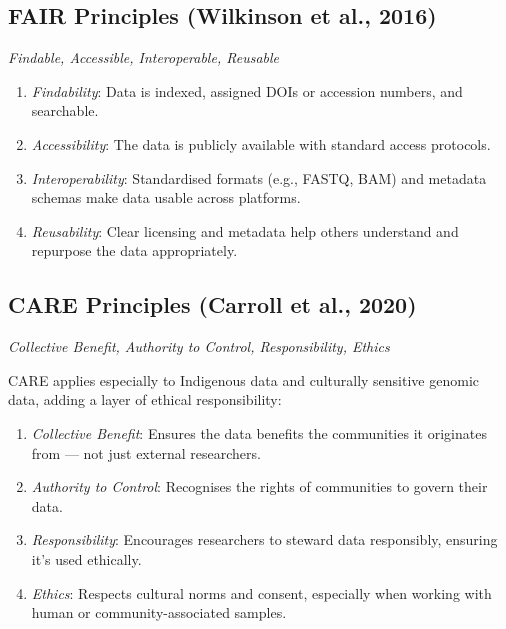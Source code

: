 \documentclass[
]{article}
\begin{document}
\hypertarget{fair-principles-wilkinson-et-al.-2016}{%
\subsection{FAIR Principles (Wilkinson et al.,
2016)}\label{fair-principles-wilkinson-et-al.-2016}}

\emph{Findable, Accessible, Interoperable, Reusable}

\begin{enumerate}
\def\labelenumi{\arabic{enumi}.}
\item
  \emph{Findability}: Data is indexed, assigned DOIs or accession
  numbers, and searchable.
\item
  \emph{Accessibility}: The data is publicly available with standard
  access protocols.
\item
  \emph{Interoperability}: Standardised formats (e.g., FASTQ, BAM) and
  metadata schemas make data usable across platforms.
\item
  \emph{Reusability}: Clear licensing and metadata help others
  understand and repurpose the data appropriately.
\end{enumerate}

\hypertarget{care-principles-carroll-et-al.-2020}{%
\subsection{CARE Principles (Carroll et al.,
2020)}\label{care-principles-carroll-et-al.-2020}}

\emph{Collective Benefit, Authority to Control, Responsibility, Ethics}

CARE applies especially to Indigenous data and culturally sensitive
genomic data, adding a layer of ethical responsibility:

\begin{enumerate}
\def\labelenumi{\arabic{enumi}.}
\item
  \emph{Collective Benefit}: Ensures the data benefits the communities
  it originates from --- not just external researchers.
\item
  \emph{Authority to Control}: Recognises the rights of communities to
  govern their data.
\item
  \emph{Responsibility}: Encourages researchers to steward data
  responsibly, ensuring it's used ethically.
\item
  \emph{Ethics}: Respects cultural norms and consent, especially when
  working with human or community-associated samples.
\end{enumerate}
\end{document}
